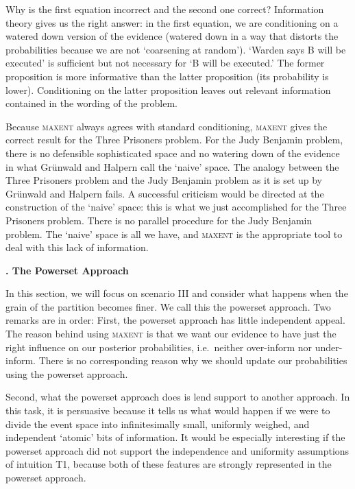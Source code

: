 \documentclass[12pt]{article}
\newcommand{\kapt}[1]{\noindent \textbf{{\thechap}. #1}\addtocounter{chap}{1}}
\newcommand{\qnull}[1]{`#1'}
\newcommand{\nias}{\noindent} %
\newcommand{\nial}{\noindent} %
\begin{document}
\nial Why is the first equation incorrect and the second one correct?
Information theory gives us the right answer: in the first equation,
we are conditioning on a watered down version of the evidence (watered
down in a way that distorts the probabilities because we are not
\qnull{coarsening at random}). \qnull{Warden says B will be executed}
is sufficient but not necessary for \qnull{B will be executed.} The
former proposition is more informative than the latter proposition
(its probability is lower). Conditioning on the latter proposition
leaves out relevant information contained in the wording of the
problem.

Because \textsc{maxent} always agrees with standard conditioning,
\textsc{maxent} gives the correct result for the Three Prisoners
problem. For the Judy Benjamin problem, there is no defensible
sophisticated space and no watering down of the evidence in what
Gr{\"u}nwald and Halpern call the \qnull{naive} space. The analogy
between the Three Prisoners problem and the Judy Benjamin problem as
it is set up by Gr{\"u}nwald and Halpern fails. A successful criticism
would be directed at the construction of the \qnull{naive} space: this
is what we just accomplished for the Three Prisoners problem. There is
no parallel procedure for the Judy Benjamin problem. The \qnull{naive}
space is all we have, and \textsc{maxent} is the appropriate tool to
deal with this lack of information.

\medskip

\kapt{The Powerset Approach}

\nias In this section, we will focus on scenario III and consider what
happens when the grain of the partition becomes finer. We call this
the powerset approach. Two remarks are in order: First, the powerset
approach has little independent appeal. The reason behind using
\textsc{maxent} is that we want our evidence to have just the right
influence on our posterior probabilities, i.e.\ neither over-inform
nor under-inform. There is no corresponding reason why we should
update our probabilities using the powerset approach.

Second, what the powerset approach does is lend support to another
approach. In this task, it is persuasive because it tells us what
would happen if we were to divide the event space into infinitesimally
small, uniformly weighed, and independent \qnull{atomic} bits of
information. It would be especially interesting if the powerset
approach did not support the independence and uniformity assumptions
of intuition T1, because both of these features are strongly
represented in the powerset approach.
\end{document}
